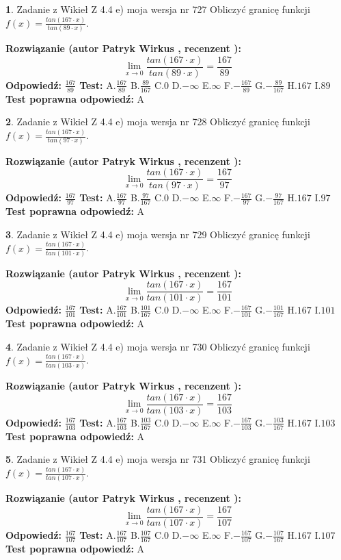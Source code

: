 \documentclass[12pt, a4paper]{article}
\theoremstyle{definition} %
\newtheorem{zad}{}
\newcommand{\zadStart}[1]{\begin{zad}#1\newline}
\newcommand{\zadStop}{\end{zad}}
\newcommand{\rozwStart}[2]{\noindent \textbf{Rozwiązanie (autor #1 , recenzent #2): }\newline}
\newcommand{\rozwStop}{\newline}
\newcommand{\odpStart}{\noindent \textbf{Odpowiedź:}\newline}
\newcommand{\odpStop}{\newline}
\newcommand{\testStart}{\noindent \textbf{Test:}\newline}
\newcommand{\testStop}{\newline}
\newcommand{\kluczStart}{\noindent \textbf{Test poprawna odpowiedź:}\newline}
\newcommand{\kluczStop}{\newline}
\begin{document}
\zadStart{Zadanie z Wikieł Z 4.4 e) moja wersja nr 727}
Obliczyć granicę funkcji $f(x)=\frac{tan(167\cdot x)}{tan(89\cdot x)}$.
\zadStop
\rozwStart{Patryk Wirkus}{}
$$\lim\limits_{x\to 0}\frac{tan(167\cdot x)}{tan(89\cdot x)}=
\frac{167}{89}$$
\rozwStop
\odpStart
$\frac{167}{89}$
\odpStop
\testStart
A.$\frac{167}{89}$
B.$\frac{89}{167}$
C.$0$
D.$-\infty$
E.$\infty$
F.$-\frac{167}{89}$
G.$-\frac{89}{167}$
H.$167$
I.$89$
\testStop
\kluczStart
A
\kluczStop



\zadStart{Zadanie z Wikieł Z 4.4 e) moja wersja nr 728}
Obliczyć granicę funkcji $f(x)=\frac{tan(167\cdot x)}{tan(97\cdot x)}$.
\zadStop
\rozwStart{Patryk Wirkus}{}
$$\lim\limits_{x\to 0}\frac{tan(167\cdot x)}{tan(97\cdot x)}=
\frac{167}{97}$$
\rozwStop
\odpStart
$\frac{167}{97}$
\odpStop
\testStart
A.$\frac{167}{97}$
B.$\frac{97}{167}$
C.$0$
D.$-\infty$
E.$\infty$
F.$-\frac{167}{97}$
G.$-\frac{97}{167}$
H.$167$
I.$97$
\testStop
\kluczStart
A
\kluczStop



\zadStart{Zadanie z Wikieł Z 4.4 e) moja wersja nr 729}
Obliczyć granicę funkcji $f(x)=\frac{tan(167\cdot x)}{tan(101\cdot x)}$.
\zadStop
\rozwStart{Patryk Wirkus}{}
$$\lim\limits_{x\to 0}\frac{tan(167\cdot x)}{tan(101\cdot x)}=
\frac{167}{101}$$
\rozwStop
\odpStart
$\frac{167}{101}$
\odpStop
\testStart
A.$\frac{167}{101}$
B.$\frac{101}{167}$
C.$0$
D.$-\infty$
E.$\infty$
F.$-\frac{167}{101}$
G.$-\frac{101}{167}$
H.$167$
I.$101$
\testStop
\kluczStart
A
\kluczStop



\zadStart{Zadanie z Wikieł Z 4.4 e) moja wersja nr 730}
Obliczyć granicę funkcji $f(x)=\frac{tan(167\cdot x)}{tan(103\cdot x)}$.
\zadStop
\rozwStart{Patryk Wirkus}{}
$$\lim\limits_{x\to 0}\frac{tan(167\cdot x)}{tan(103\cdot x)}=
\frac{167}{103}$$
\rozwStop
\odpStart
$\frac{167}{103}$
\odpStop
\testStart
A.$\frac{167}{103}$
B.$\frac{103}{167}$
C.$0$
D.$-\infty$
E.$\infty$
F.$-\frac{167}{103}$
G.$-\frac{103}{167}$
H.$167$
I.$103$
\testStop
\kluczStart
A
\kluczStop



\zadStart{Zadanie z Wikieł Z 4.4 e) moja wersja nr 731}
Obliczyć granicę funkcji $f(x)=\frac{tan(167\cdot x)}{tan(107\cdot x)}$.
\zadStop
\rozwStart{Patryk Wirkus}{}
$$\lim\limits_{x\to 0}\frac{tan(167\cdot x)}{tan(107\cdot x)}=
\frac{167}{107}$$
\rozwStop
\odpStart
$\frac{167}{107}$
\odpStop
\testStart
A.$\frac{167}{107}$
B.$\frac{107}{167}$
C.$0$
D.$-\infty$
E.$\infty$
F.$-\frac{167}{107}$
G.$-\frac{107}{167}$
H.$167$
I.$107$
\testStop
\kluczStart
A
\kluczStop
\end{document}
